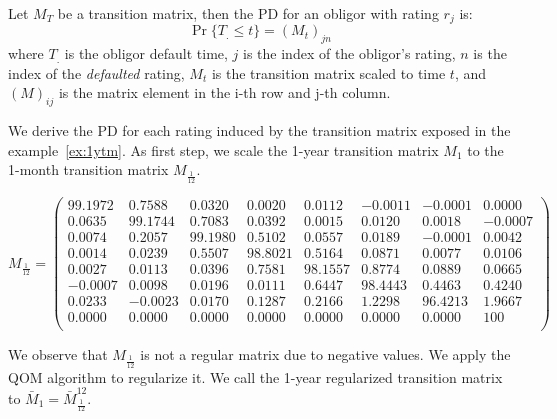 \documentclass[11pt,fleqn]{book} %
\begin{document}
\begin{proposition}
	\label{prop:pdftm}
	Let $M_T$ be a transition matrix, then the PD for an obligor with 
	rating $r_j$ is:
	\begin{displaymath}
		\Pr\{T_. \le t\} = \left( M_t \right)_{jn}
	\end{displaymath}
	where $T_.$ is the obligor default time, $j$ is the index of the obligor's
	rating, $n$ is the index of the \emph{defaulted} rating, $M_t$ is the 
	transition matrix scaled to time $t$, and $(M)_{ij}$ is the matrix element
	in the i-th row and j-th column.
\end{proposition}

\begin{example}
	\label{ex:pdftm}
	We derive the PD for each rating induced by the transition matrix exposed
	in the example~\ref{ex:1ytm}. As first step, we scale the 1-year transition 
	matrix $M_1$ to the 1-month transition matrix $M_{\frac{1}{12}}$.
	{\small
	\begin{displaymath}
		M_{\frac{1}{12}} = \left(
		\begin{array}{cccccccc}
			99.1972 &  0.7588 &  0.0320 &  0.0020 &  0.0112 & -0.0011 & -0.0001 &   0.0000 \\
			 0.0635 & 99.1744 &  0.7083 &  0.0392 &  0.0015 &  0.0120 &  0.0018 &  -0.0007 \\
			 0.0074 &  0.2057 & 99.1980 &  0.5102 &  0.0557 &  0.0189 & -0.0001 &   0.0042 \\
			 0.0014 &  0.0239 &  0.5507 & 98.8021 &  0.5164 &  0.0871 &  0.0077 &   0.0106 \\
			 0.0027 &  0.0113 &  0.0396 &  0.7581 & 98.1557 &  0.8774 &  0.0889 &   0.0665 \\
			-0.0007 &  0.0098 &  0.0196 &  0.0111 &  0.6447 & 98.4443 &  0.4463 &   0.4240 \\
			 0.0233 & -0.0023 &  0.0170 &  0.1287 &  0.2166 &  1.2298 & 96.4213 &   1.9667 \\
			 0.0000 &  0.0000 &  0.0000 &  0.0000 &  0.0000 &  0.0000 &  0.0000 & 100 \\
		\end{array}
		\right)
	\end{displaymath}\par}
	We observe that $M_{\frac{1}{12}}$ is not a regular matrix due to negative
	values. We apply the QOM algorithm to regularize it. We call the 1-year 
	regularized transition matrix to $\bar{M}_1 = \bar{M}_{\frac{1}{12}}^{12}$.
	{\small
	\begin{displaymath}

\end{displaymath}}
\end{example}
\end{document}
